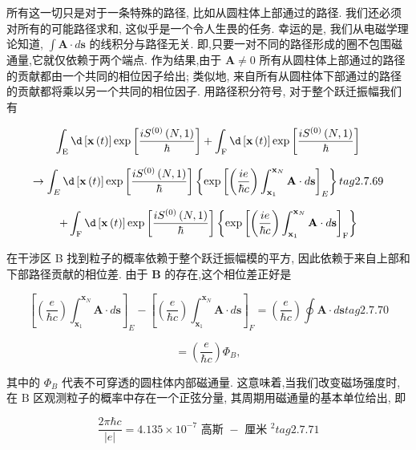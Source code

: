 \documentclass[lang=cn,newtx,10pt,scheme=chinese,thmcnt=section]{elegantbook}
\begin{document}
所有这一切只是对于一条特殊的路径, 比如从圆柱体上部通过的路径. 我们还必须对所有的可能路径求和, 这似乎是一个令人生畏的任务. 幸运的是, 我们从电磁学理论知道, $\int \mathbf{A} \cdot d\mathbf{s}$ 的线积分与路径无关. 即,只要一对不同的路径形成的圈不包围磁通量,它就仅依赖于两个端点. 作为结果,由于 $\mathbf{A} \neq 0$ 所有从圆柱体上部通过的路径的贡献都由一个共同的相位因子给出; 类似地, 来自所有从圆柱体下部通过的路径的贡献都将乘以另一个共同的相位因子. 用路径积分符号, 对于整个跃迁振幅我们有

$$
\int_{\mathrm{E}}\mathcal{\d}\left\lbrack {\mathbf{x}\left( t\right) }\right\rbrack \exp \left\lbrack \frac{i{S}^{\left( 0\right) }\left( {N,1}\right) }{\hbar }\right\rbrack + \int_{\mathrm{F}}\mathcal{\d}\left\lbrack {\mathbf{x}\left( t\right) }\right\rbrack \exp \left\lbrack \frac{i{S}^{\left( 0\right) }\left( {N,1}\right) }{\hbar }\right\rbrack
$$

$$
\rightarrow \int_{E}\mathcal{\d}\left\lbrack {\mathbf{x}\left( t\right) }\right\rbrack \exp \left\lbrack \frac{i{S}^{\left( 0\right) }\left( {N,1}\right) }{\hbar }\right\rbrack \left\{ {\exp {\left\lbrack \left( \frac{ie}{\hbar c}\right) \int_{{\mathbf{x}}_{1}}^{{\mathbf{x}}_{N}}\mathbf{A} \cdot d\mathbf{s}\right\rbrack }_{E}}\right\} tag{2. 7.69}
$$

$$
+ \int_{\mathrm{F}}\mathcal{\d}\left\lbrack {\mathbf{x}\left( t\right) }\right\rbrack \exp \left\lbrack \frac{i{S}^{\left( 0\right) }\left( {N,1}\right) }{\hbar }\right\rbrack \left\{ {\exp {\left\lbrack \left( \frac{ie}{\hbar c}\right) \int_{{\mathbf{x}}_{1}}^{{\mathbf{x}}_{N}}\mathbf{A} \cdot d\mathbf{s}\right\rbrack }_{\mathrm{F}}}\right\}
$$

在干涉区 B 找到粒子的概率依赖于整个跃迁振幅模的平方, 因此依赖于来自上部和下部路径贡献的相位差. 由于 $\mathbf{B}$ 的存在,这个相位差正好是

$$
{\left\lbrack \left( \frac{e}{\hbar c}\right) \int_{{\mathbf{x}}_{1}}^{{\mathbf{x}}_{N}}\mathbf{A} \cdot d\mathbf{s}\right\rbrack }_{E} - {\left\lbrack \left( \frac{e}{\hbar c}\right) \int_{{\mathbf{x}}_{1}}^{{\mathbf{x}}_{N}}\mathbf{A} \cdot d\mathbf{s}\right\rbrack }_{F} = \left( \frac{e}{\hbar c}\right) \oint \mathbf{A} \cdot d\mathbf{s} tag{2.7.70}
$$

$$
= \left( \frac{e}{\hbar c}\right) {\Phi }_{B},
$$

其中的 ${\Phi }_{B}$ 代表不可穿透的圆柱体内部磁通量. 这意味着,当我们改变磁场强度时,在 $\mathrm{B}$ 区观测粒子的概率中存在一个正弦分量, 其周期用磁通量的基本单位给出, 即

$$
\frac{{2\pi }\hbar c}{\left| e\right| } = {4.135} \times {10}^{-7}\text{ 高斯 } - \text{ 厘米 }{}^{2} tag{2.7.71}
$$
\end{document}
